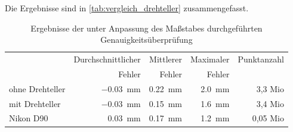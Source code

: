 \documentclass[./00PhotoBox.tex]{subfiles}
\begin{document}
Die Ergebnisse sind in \autoref{tab:vergleich_drehteller} zusammengefasst.

\begin{table}
    \centering
    \caption{Ergebnisse der unter Anpassung des Maßstabes durchgeführten Genauigkeitsüberprüfung}
    \label{tab:vergleich_drehteller}
    \begin{tabular}{l|r|r|r|r}
        \toprule
                        & Durchschnittlicher       & Mittlerer               & Maximaler              & Punktanzahl \\
                        & Fehler                   & Fehler                  & Fehler                 &             \\
        \midrule
        ohne Drehteller & \SI{-0,03}{\milli\metre} & \SI{0,22}{\milli\metre} & \SI{2,0}{\milli\metre} & 3,3 Mio     \\
        mit Drehteller  & \SI{-0,03}{\milli\metre} & \SI{0,15}{\milli\metre} & \SI{1,6}{\milli\metre} & 3,4 Mio     \\
        Nikon D90       & \SI{0,03}{\milli\metre}  & \SI{0,17}{\milli\metre} & \SI{1,2}{\milli\metre} & 0,05 Mio    \\
        \bottomrule
    \end{tabular}
\end{table}
\end{document}
